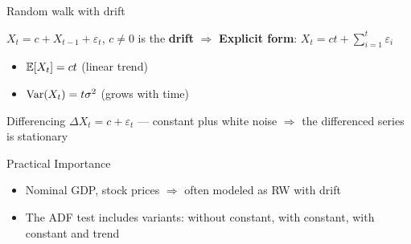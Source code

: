 \documentclass[9pt, aspectratio=169, t]{beamer}
\begin{document}
\begin{frame}{Random walk with drift}
    \vspace{-0.3cm}
    {\footnotesize
    \begin{defn}
        $X_t = c + X_{t-1} + \varepsilon_t$, \; $c \neq 0$ is the \textbf{drift} \;\;
        $\Rightarrow$ \textbf{Explicit form}: $X_t = ct + \sum_{i=1}^{t} \varepsilon_i$
    \end{defn}
    \vspace{-2mm}
    \begin{prop}[Properties]
        \begin{itemize}\setlength{\itemsep}{0pt}
            \item $\mathbb{E}[X_t] = ct$ (linear trend)
            \item $\text{Var}(X_t) = t\sigma^2$ (grows with time)
        \end{itemize}
    \end{prop}
    \vspace{-2mm}
    \begin{alertblock}{Differencing}
        $\Delta X_t = c + \varepsilon_t$ \; --- constant plus white noise $\Rightarrow$ the differenced series is stationary
    \end{alertblock}
    \vspace{-2mm}
    \begin{exampleblock}{Practical Importance}
        \begin{itemize}\setlength{\itemsep}{0pt}
            \item Nominal GDP, stock prices $\Rightarrow$ often modeled as RW with drift
            \item The ADF test includes variants: without constant, with constant, with constant and trend
        \end{itemize}
    \end{exampleblock}
    }
\end{frame}
\end{document}
